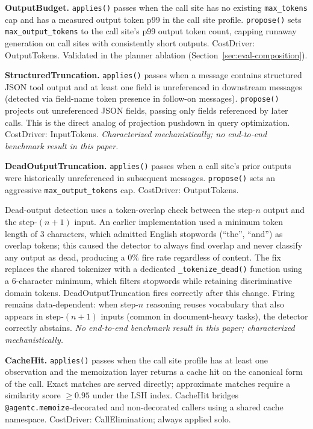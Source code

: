 \textbf{OutputBudget.} \texttt{applies()} passes when the call site has no existing
\texttt{max\_tokens} cap and has a measured output token p99 in the call site profile.
\texttt{propose()} sets \texttt{max\_output\_tokens} to the call site's p99 output
token count, capping runaway generation on call sites with consistently short outputs.
CostDriver: OutputTokens. Validated in the planner ablation
(Section~\ref{sec:eval-composition}).

\textbf{StructuredTruncation.} \texttt{applies()} passes when a message contains
structured JSON tool output and at least one field is unreferenced in downstream
messages (detected via field-name token presence in follow-on messages).
\texttt{propose()} projects out unreferenced JSON fields, passing only fields
referenced by later calls. This is the direct analog of projection pushdown in query
optimization. CostDriver: InputTokens. \textit{Characterized mechanistically; no
end-to-end benchmark result in this paper.}

\textbf{DeadOutputTruncation.} \texttt{applies()} passes when a call site's prior
outputs were historically unreferenced in subsequent messages. \texttt{propose()} sets
an aggressive \texttt{max\_output\_tokens} cap. CostDriver: OutputTokens.

Dead-output detection uses a token-overlap check between the step-$n$ output and
the step-$(n+1)$ input. An earlier implementation used a minimum token length of
3 characters, which admitted English stopwords (``the'', ``and'') as overlap
tokens; this caused the detector to always find overlap and never classify any
output as dead, producing a 0\% fire rate regardless of content. The fix replaces
the shared tokenizer with a dedicated \texttt{\_tokenize\_dead()} function using a
6-character minimum, which filters stopwords while retaining discriminative domain
tokens. DeadOutputTruncation fires correctly after this change. Firing remains
data-dependent: when step-$n$ reasoning reuses vocabulary that also appears in
step-$(n+1)$ inputs (common in document-heavy tasks), the detector correctly
abstains. \textit{No end-to-end benchmark result in this paper; characterized
mechanistically.}

\textbf{CacheHit.} \texttt{applies()} passes when the call site profile has at least
one observation and the memoization layer returns a cache hit on the canonical form of
the call. Exact matches are served directly; approximate matches require a similarity
score $\geq 0.95$ under the LSH index. CacheHit bridges
\texttt{@agentc.memoize}-decorated and non-decorated callers using a shared cache
namespace. CostDriver: CallElimination; always applied solo.

